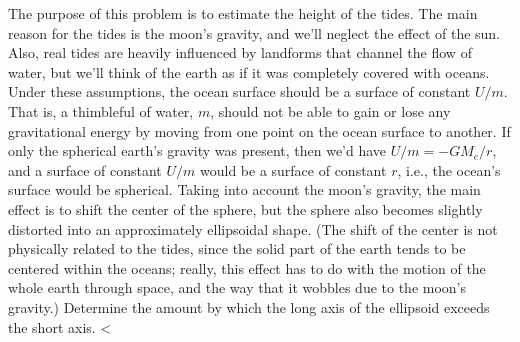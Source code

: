 The purpose of this problem is to estimate the height of the tides. The main
        reason for the tides is the moon's gravity, and we'll neglect the effect of the sun.
        Also, real tides are heavily influenced by landforms that channel the flow of
        water, but we'll think of the earth as if it was completely covered with oceans.
        Under these assumptions, the ocean surface should be a surface of constant
        $U/m$. That is, a thimbleful of water, $m$, should not be able to gain or lose
        any gravitational energy by moving from one point on the ocean surface to
        another. If only the spherical earth's gravity was present, then we'd have
        $U/m=-GM_e/r$, and a surface of constant $U/m$ would be a surface of
        constant $r$, i.e., the ocean's surface would be spherical. Taking into account
        the moon's gravity, the main effect is to shift the center of the sphere, but the
        sphere also becomes slightly distorted into an approximately ellipsoidal shape.
        (The shift of the center is not physically related to the tides, since the solid part
        of the earth tends to be centered within the oceans; really, this effect has to
        do with the motion of the whole earth through space, and the way that it
        wobbles due to the moon's gravity.) Determine the amount by which the long
        axis of the ellipsoid exceeds the short axis.
        <%
